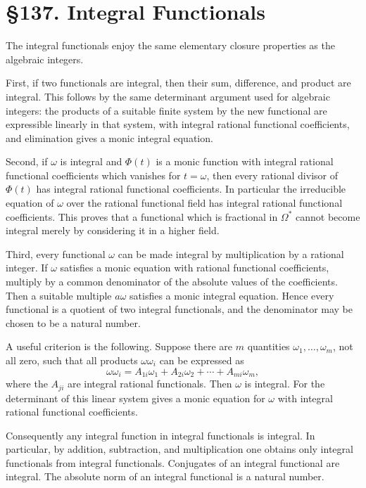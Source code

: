 \documentclass[11pt,a4paper]{book}
\newcommand{\webersection}[2]{\clearpage\section*{\S #1. #2}}
\begin{document}
\webersection{137}{Integral Functionals}

The integral functionals enjoy the same elementary closure properties as the algebraic integers.

First, if two functionals are integral, then their sum, difference, and product are integral.  This follows by the same determinant argument used for algebraic integers: the products of a suitable finite system by the new functional are expressible linearly in that system, with integral rational functional coefficients, and elimination gives a monic integral equation.

Second, if \(\omega\) is integral and \(\Phi(t)\) is a monic function with integral rational functional coefficients which vanishes for \(t=\omega\), then every rational divisor of \(\Phi(t)\) has integral rational functional coefficients.  In particular the irreducible equation of \(\omega\) over the rational functional field has integral rational functional coefficients.  This proves that a functional which is fractional in \(\Omega^*\) cannot become integral merely by considering it in a higher field.

Third, every functional \(\omega\) can be made integral by multiplication by a rational integer.  If \(\omega\) satisfies a monic equation with rational functional coefficients, multiply by a common denominator of the absolute values of the coefficients.  Then a suitable multiple \(a\omega\) satisfies a monic integral equation.  Hence every functional is a quotient of two integral functionals, and the denominator may be chosen to be a natural number.

A useful criterion is the following.  Suppose there are \(m\) quantities \(\omega_1,
\ldots,
\omega_m\), not all zero, such that all products \(\omega\omega_i\) can be expressed as
\begin{equation}
 \omega\omega_i=A_{1i}\omega_1+A_{2i}\omega_2+\cdots+A_{mi}\omega_m, \tag{1}
\end{equation}
where the \(A_{ji}\) are integral rational functionals.  Then \(\omega\) is integral.  For the determinant of this linear system gives a monic equation for \(\omega\) with integral rational functional coefficients.

Consequently any integral function in integral functionals is integral.  In particular, by addition, subtraction, and multiplication one obtains only integral functionals from integral functionals.  Conjugates of an integral functional are integral.  The absolute norm of an integral functional is a natural number.
\end{document}
